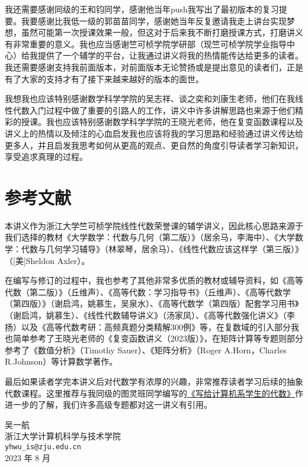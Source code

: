 我还需要感谢同级的王和钧同学，感谢他当年push我写出了最初版本的复习提要。我要感谢比我低一级的郭苗苗同学，感谢她当年反复邀请我走上讲台实现梦想，虽然可能第一次授课效果一般，但这对于后来我不断打磨授课方式，打磨讲义有非常重要的意义。我也应当感谢竺可桢学院学研部（现竺可桢学院学业指导中心）给我提供了一个辅学的平台，让我通过讲义将我的热情能传达给更多的读者。我还需要感谢支持我前面版本，对前面版本无论赞扬或是提出意见的读者们，正是有了大家的支持才有了接下来越来越好的版本的面世。

我想我也应该特别感谢数学科学学院的吴志祥、谈之奕和刘康生老师，他们在我线性代数入门过程中做了重要的引路人的工作，讲义中许多讲解思路也来源于他们精彩的授课。我也应该特别感谢数学科学学院的王晓光老师，他在复变函数课程以及讲义上的热情以及倾注的心血启发我也应该将我的学习思路和经验通过讲义传达给更多人，并且启发我思考如何从更高的观点、更自然的角度引导读者学习新知识，享受追求真理的过程。

\section*{参考文献}

本讲义作为浙江大学竺可桢学院线性代数荣誉课的辅学讲义，因此核心思路来源于我们选择的教材《大学数学：代数与几何（第二版）》（居余马，李海中）、《大学数学：代数与几何学习辅导》（林翠琴，居余马）、《线性代数应该这样学（第三版）》（[美]Sheldon Axler）。

在编写与修订的过程中，我也参考了其他非常多优质的教材或辅导资料，如《高等代数（第二版）》（丘维声）、《高等代数：学习指导书》（丘维声）、《高等代数学（第四版）》（谢启鸿，姚慕生，吴泉水）、《高等代数学（第四版）配套学习用书》（谢启鸿，姚慕生）、《线性代数辅导讲义》（汤家凤）、《高等代数强化讲义》（李扬）以及《高等代数考研：高频真题分类精解300例》等，在复数域的引入部分我也简单参考了王晓光老师的《复变函数讲义（2023版）》，在矩阵计算等专题则部分参考了《数值分析》（Timothy Sauer）、《矩阵分析》（Roger A.Horn，Charles R.Johnson）等计算数学著作。

最后如果读者学完本讲义后对代数学有浓厚的兴趣，非常推荐读者学习后续的抽象代数课程。这里推荐与我同级的图灵班同学编写的\href{https://frightenedfoxcn.github.io/notes/series/alg-for-cs/}{《写给计算机系学生的代数》}作进一步的了解，我们许多高级专题都对这一讲义有引用。

\begin{flushright}
    \kaishu
    吴一航 \\
    浙江大学计算机科学与技术学院 \\
    \verb|yhwu_is@zju.edu.cn| \\
    2023 年 8 月
\end{flushright}
